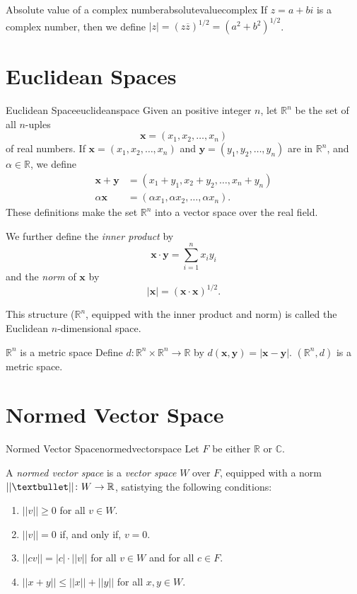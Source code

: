 \begin{defn}{Absolute value of a complex number}{absolutevaluecomplex}
	If \(z = a + bi\) is a complex number, then we define \(|z| = (z\overline z)^{1/2} = (a^2 + b^2)^{1/2}\).
\end{defn}

\section{Euclidean Spaces}

\begin{defn}{Euclidean Space}{euclideanspace}
	Given an positive integer \(n\), let \(\mathbb{R}^n\) be the set of all \(n\)-uples \[
		\mathbf x = (x_1, x_2, \dots, x_n)
	\] of real numbers. If \(\mathbf x = (x_1, x_2, \dots, x_n)\) and \(\mathbf y = (y_1, y_2, \dots, y_n)\) are in \(\mathbb{R}^n\), and \(\alpha \in \mathbb{R}\), we define
	\begin{align*}
		\mathbf x + \mathbf y &= (x_1 + y_1, x_2 + y_2, \dots, x_n + y_n) \\
		\alpha \mathbf x &= (\alpha x_1, \alpha x_2, \dots, \alpha x_n).
	\end{align*}
	These definitions make the set \(\mathbb{R}^n\) into a vector space over the real field.

	We further define the \emph{inner product} by \[
		\mathbf x \cdot \mathbf y = \sum_{i=1}^n x_iy_i
	\]
	and the \emph{norm} of \(\mathbf x\) by \[
		|\mathbf x| = (\mathbf x \cdot \mathbf x)^{1/2}.
	\]

	This structure (\(\mathbb{R}^n\), equipped with the inner product and norm) is called the Euclidean \(n\)-dimensional space.
\end{defn}

\begin{prop}{\(\mathbb{R}^n\) is a metric space}{}
	Define \(d \colon \mathbb{R}^n \times \mathbb{R}^n \to \mathbb{R}\) by \(d(\mathbf x, \mathbf y) = |\mathbf x - \mathbf y|\). \((\mathbb{R}^n, d)\) is a metric space.
\end{prop}

\section{Normed Vector Space}

\begin{defn}{Normed Vector Space}{normedvectorspace}
	Let \(F\) be either \(\mathbb{R}\) or \(\mathbb{C}\).

	A \emph{normed vector space} is a \emph{vector space} \(W\) over \(F\), equipped with a norm \(||\textbullet||\colon W \to \mathbb{R}\), satistying the following conditions:
	\begin{enumerate}
		\item \(||v|| \geq 0\) for all \(v \in W\).
		\item \(||v|| = 0\) if, and only if, \(v = 0\).
		\item \(||cv|| = |c| \cdot ||v||\) for all \(v \in W\) and for all \(c \in F\).
		\item \(||x + y|| \leq ||x|| + ||y||\) for all \(x, y \in W\).
	\end{enumerate}
\end{defn}


